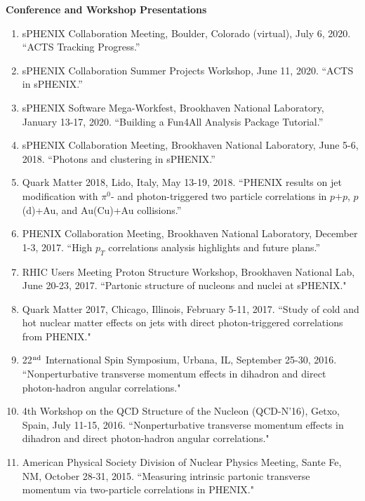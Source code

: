 \documentclass[11pt]{article}
\begin{document}
\begin{flushleft}
\Large\textbf{Conference and Workshop Presentations} \\
\normalsize
\begin{enumerate}
\item sPHENIX Collaboration Meeting, Boulder, Colorado (virtual), July 6, 2020. ``ACTS Tracking Progress.''
\item sPHENIX Collaboration Summer Projects Workshop, June 11, 2020. ``ACTS in sPHENIX.''
\item sPHENIX Software Mega-Workfest, Brookhaven National Laboratory, January 13-17, 2020. ``Building a Fun4All Analysis Package Tutorial.''
\item sPHENIX Collaboration Meeting, Brookhaven National Laboratory, June 5-6, 2018. ``Photons and clustering in sPHENIX.''
\item Quark Matter 2018, Lido, Italy, May 13-19, 2018. ``PHENIX results on jet modification with $\pi^0$- and photon-triggered two particle correlations in $p$$+$$p$, $p$(d)+Au, and Au(Cu)+Au collisions.''

\item PHENIX Collaboration Meeting, Brookhaven National Laboratory, December 1-3, 2017. ``High $p_T$ correlations analysis highlights and future plans.''

\item RHIC Users Meeting Proton Structure Workshop, Brookhaven National Lab, June 20-23, 2017. ``Partonic structure of nucleons and nuclei at sPHENIX."

\item Quark Matter 2017, Chicago, Illinois, February 5-11, 2017. ``Study of cold and hot nuclear matter effects on jets with direct photon-triggered correlations from PHENIX."


\item 22$^{\rm nd}$ International Spin Symposium, Urbana, IL, September 25-30, 2016. ``Nonperturbative transverse momentum effects in dihadron and direct photon-hadron angular correlations."

\item 4th Workshop on the QCD Structure of the Nucleon (QCD-N'16), Getxo, Spain, July 11-15, 2016. ``Nonperturbative transverse momentum effects in dihadron and direct photon-hadron angular correlations."

\item American Physical Society Division of Nuclear Physics Meeting, Sante Fe, NM, October 28-31, 2015. ``Measuring intrinsic partonic transverse momentum via two-particle correlations in PHENIX."


\end{enumerate}
\end{flushleft}
\end{document}
